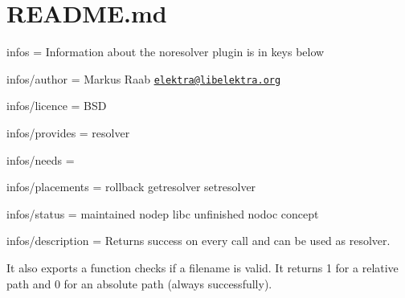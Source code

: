 \hypertarget{md_src_plugins_noresolver_README_src_plugins_noresolver_README_md}{}\section{R\+E\+A\+D\+M\+E.\+md}\label{md_src_plugins_noresolver_README_src_plugins_noresolver_README_md}

\begin{DoxyItemize}
\item infos = Information about the noresolver plugin is in keys below
\item infos/author = Markus Raab \href{mailto:elektra@libelektra.org}{\tt elektra@libelektra.\+org}
\item infos/licence = B\+S\+D
\item infos/provides = resolver
\item infos/needs =
\item infos/placements = rollback getresolver setresolver
\item infos/status = maintained nodep libc unfinished nodoc concept
\item infos/description = Returns success on every call and can be used as resolver.
\end{DoxyItemize}

It also exports a function checks if a filename is valid. It returns 1 for a relative path and 0 for an absolute path (always successfully). 